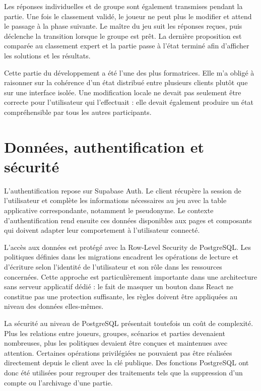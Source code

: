 Les réponses individuelles et de groupe sont également transmises pendant la partie. Une fois le classement validé, le joueur ne peut plus le modifier et attend le passage à la phase suivante. Le maître du jeu suit les réponses reçues, puis déclenche la transition lorsque le groupe est prêt. La dernière proposition est comparée au classement expert et la partie passe à l'état terminé afin d'afficher les solutions et les résultats.

Cette partie du développement a été l'une des plus formatrices. Elle m'a obligé à raisonner sur la cohérence d'un état distribué entre plusieurs clients plutôt que sur une interface isolée. Une modification locale ne devait pas seulement être correcte pour l'utilisateur qui l'effectuait : elle devait également produire un état compréhensible par tous les autres participants.

\section{Données, authentification et sécurité}

L'authentification repose sur Supabase Auth. Le client récupère la session de l'utilisateur et complète les informations nécessaires au jeu avec la table applicative correspondante, notamment le pseudonyme. Le contexte d'authentification rend ensuite ces données disponibles aux pages et composants qui doivent adapter leur comportement à l'utilisateur connecté.

L'accès aux données est protégé avec la Row-Level Security de PostgreSQL. Les politiques définies dans les migrations encadrent les opérations de lecture et d'écriture selon l'identité de l'utilisateur et son rôle dans les ressources concernées. Cette approche est particulièrement importante dans une architecture sans serveur applicatif dédié : le fait de masquer un bouton dans React ne constitue pas une protection suffisante, les règles doivent être appliquées au niveau des données elles-mêmes.

La sécurité au niveau de PostgreSQL présentait toutefois un coût de complexité. Plus les relations entre joueurs, groupes, scénarios et parties devenaient nombreuses, plus les politiques devaient être conçues et maintenues avec attention. Certaines opérations privilégiées ne pouvaient pas être réalisées directement depuis le client avec la clé publique. Des fonctions PostgreSQL ont donc été utilisées pour regrouper des traitements tels que la suppression d'un compte ou l'archivage d'une partie.

